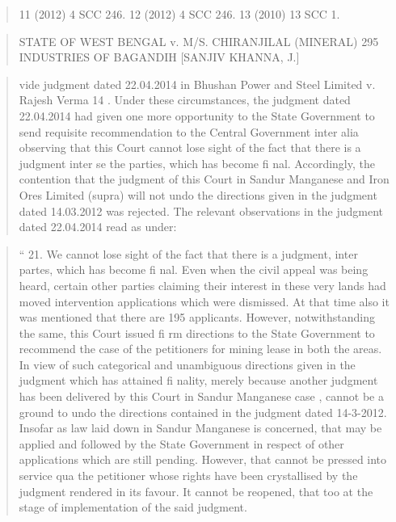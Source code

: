 \documentclass[12pt,a4paper]{article}
\newenvironment{judgequote}
  {\begin{quote}\small}
  {\end{quote}}
\begin{document}
\begin{judgequote}
11 (2012) 4 SCC 246.
12 (2012) 4 SCC 246.
13 (2010) 13 SCC 1.
\end{judgequote}



\begin{judgequote}
STATE OF WEST BENGAL v. M/S. CHIRANJILAL (MINERAL) 295
INDUSTRIES OF BAGANDIH [SANJIV KHANNA, J.]
\end{judgequote}

\begin{judgequote}
vide judgment dated 22.04.2014 in Bhushan Power and Steel Limited v.
Rajesh Verma 14 . Under these circumstances, the judgment dated 22.04.2014
had given one more opportunity to the State Government to send requisite
recommendation to the Central Government inter alia observing that this
Court cannot lose sight of the fact that there is a judgment inter se the parties,
which has become fi nal. Accordingly, the contention that the judgment of
this Court in Sandur Manganese and Iron Ores Limited (supra) will not
undo the directions given in the judgment dated 14.03.2012 was rejected.
The relevant observations in the judgment dated 22.04.2014 read as under:
\end{judgequote}

\begin{judgequote}
`` 21. We cannot lose sight of the fact that there is a judgment, inter
partes, which has become fi nal. Even when the civil appeal was being
heard, certain other parties claiming their interest in these very lands
had moved intervention applications which were dismissed. At that
time also it was mentioned that there are 195 applicants. However,
notwithstanding the same, this Court issued fi rm directions to the
State Government to recommend the case of the petitioners for mining
lease in both the areas. In view of such categorical and unambiguous
directions given in the judgment which has attained fi nality, merely
because another judgment has been delivered by this Court in Sandur
Manganese case , cannot be a ground to undo the directions contained
in the judgment dated 14-3-2012. Insofar as law laid down in Sandur
Manganese is concerned, that may be applied and followed by the State
Government in respect of other applications which are still pending.
However, that cannot be pressed into service qua the petitioner whose
rights have been crystallised by the judgment rendered in its favour.
It cannot be reopened, that too at the stage of implementation of the
said judgment.
\end{judgequote}
\end{document}
